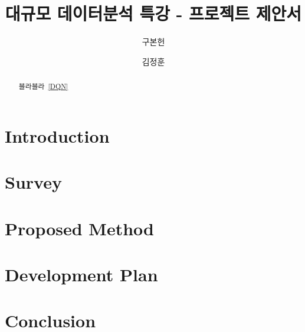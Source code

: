 \documentclass[sigconf, screen]{acmart}
\begin{document}
\title[Super Mario RL]{대규모 데이터분석 특강 - 프로젝트 제안서}

\author{구본헌}

\author{김정훈}

\begin{abstract}
	블라블라~\ref{DQN}
\end{abstract}


\maketitle
\section{Introduction}
\label{sec:intro}


\section{Survey}
\label{sec:survey}







\section{Proposed Method}
\label{sec:method}


\section{Development Plan}
\label{sec:plan}


\section{Conclusion}
\label{sec:conclusion}


\newpage
\balance


\end{document}
